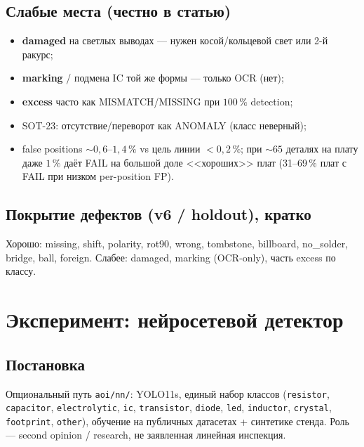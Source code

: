 \documentclass[12pt,a4paper]{article}
\begin{document}
\subsection{Слабые места (честно в статью)}
\begin{itemize}[leftmargin=1.5em,itemsep=0.15em]
  \item \textbf{damaged} на светлых выводах --- нужен косой/кольцевой свет
        или 2-й ракурс;
  \item \textbf{marking} / подмена IC той же формы --- только OCR (нет);
  \item \textbf{excess} часто как MISMATCH/MISSING при \(100\,\%\) detection;
  \item SOT-23: отсутствие/переворот как ANOMALY (класс неверный);
  \item false positions \(\sim 0{,}6\)--\(1{,}4\,\%\) vs цель линии \(<0{,}2\,\%\);
        при \(\sim 65\) деталях на плату даже \(1\,\%\) даёт FAIL на большой
        доле <<хороших>> плат (31--69\,\% плат с FAIL при низком per-position
        FP).
\end{itemize}

\subsection{Покрытие дефектов (v6 / holdout), кратко}
Хорошо: missing, shift, polarity, rot90, wrong, tombstone, billboard,
no\_solder, bridge, ball, foreign. Слабее: damaged, marking (OCR-only),
часть excess по классу.

\section{Эксперимент: нейросетевой детектор}
\label{sec:nn}

\subsection{Постановка}
Опциональный путь \texttt{aoi/nn/}: YOLO11s, единый набор классов
(\texttt{resistor}, \texttt{capacitor}, \texttt{electrolytic}, \texttt{ic},
\texttt{transistor}, \texttt{diode}, \texttt{led}, \texttt{inductor},
\texttt{crystal}, \texttt{footprint}, \texttt{other}), обучение на
публичных датасетах + синтетике стенда. Роль --- second opinion /
research, не заявленная линейная инспекция.
\end{document}
